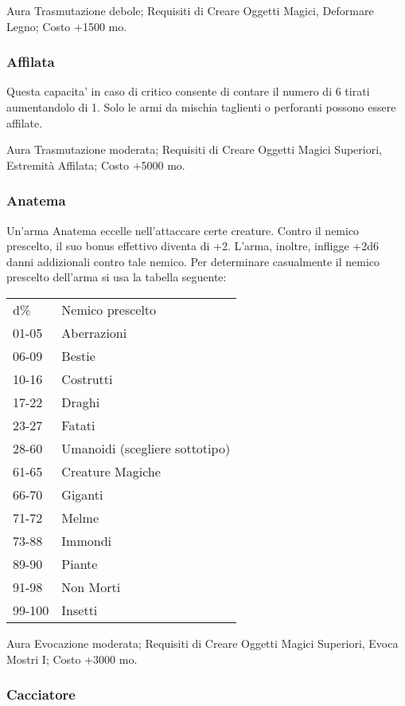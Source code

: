 \begin{multicols}{2}
Aura Trasmutazione debole; Requisiti di Creare Oggetti Magici, Deformare Legno; Costo +1500 mo.

\subsubsection{Affilata}

Questa capacita' in caso di critico consente di contare il numero di 6 tirati aumentandolo di 1.
Solo le armi da mischia taglienti o perforanti possono essere affilate.

Aura Trasmutazione moderata; Requisiti di Creare Oggetti Magici Superiori, Estremità Affilata; Costo +5000 mo.

\subsubsection{Anatema}

Un'arma Anatema eccelle nell'attaccare certe creature. Contro il nemico prescelto, il suo bonus effettivo diventa di +2. L'arma, inoltre, infligge +2d6 danni addizionali contro tale nemico. Per determinare casualmente il nemico prescelto dell'arma si usa la tabella seguente:

\medskip

\begin{tabular}{ll}
d\% 	&Nemico prescelto\\
01-05 	&Aberrazioni\\
06-09 	&Bestie\\
10-16 	&Costrutti\\
17-22 	&Draghi\\
23-27 	&Fatati\\
28-60 	&Umanoidi (scegliere sottotipo)\\
61-65 	&Creature Magiche\\
66-70 	&Giganti\\
71-72 	&Melme\\
73-88 	&Immondi\\
89-90 	&Piante\\
91-98 	&Non Morti\\
99-100 	&Insetti\\
\end{tabular}

\medskip

Aura Evocazione moderata; Requisiti di Creare Oggetti Magici Superiori, Evoca Mostri I; Costo +3000 mo.

\subsubsection{Cacciatore}


\end{multicols}
